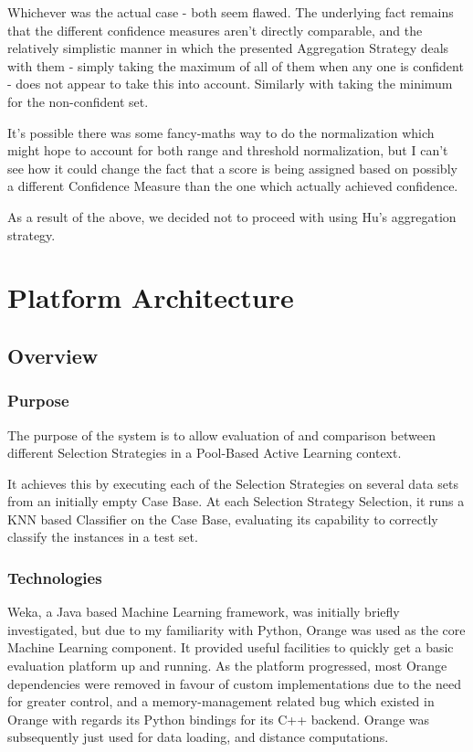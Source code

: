 \documentclass[a4paper,11pt]{report}
\begin{document}
Whichever was the actual case - both seem flawed. The underlying fact remains that the different confidence measures aren't directly comparable, and the relatively simplistic manner in which the presented Aggregation Strategy deals with them - simply taking the maximum of all of them when any one is confident - does not appear to take this into account. Similarly with taking the minimum for the non-confident set.

It's possible there was some fancy-maths way to do the normalization which might hope to account for both range and threshold normalization, but I can't see how it could change the fact that a score is being assigned based on possibly a different Confidence Measure than the one which actually achieved confidence.

As a result of the above, we decided not to proceed with using Hu's aggregation strategy.

\chapter{Platform Architecture\label{cha:platarch}}
\section{Overview}
\subsection{Purpose}
The purpose of the system is to allow evaluation of and comparison between different Selection Strategies in a Pool-Based Active Learning context.

It achieves this by executing each of the Selection Strategies on several data sets from an initially empty Case Base. At each Selection Strategy Selection, it runs a KNN based Classifier on the Case Base, evaluating its capability to correctly classify the instances in a test set.

\subsection{Technologies}
Weka\citep{prog:weka}, a Java based Machine Learning framework, was initially briefly investigated, but due to my familiarity with Python, Orange\citep{prog:orange} was used as the core Machine Learning component. It provided useful facilities to quickly get a basic evaluation platform up and running. As the platform progressed, most Orange dependencies were removed in favour of custom implementations due to the need for greater control, and a memory-management related bug which existed in Orange with regards its Python bindings for its C++ backend. Orange was subsequently just used for data loading, and distance computations.
\end{document}
